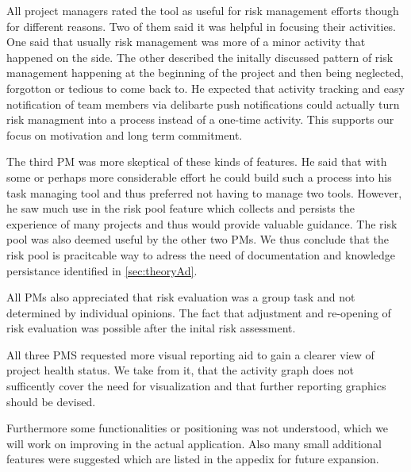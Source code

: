 All project managers rated the tool as useful for risk management efforts though for different reasons. Two of them said it was helpful in focusing their activities. One said that usually risk management was more of a minor activity that happened on the side. The other described the initally discussed pattern of risk management happening at the beginning of the project and then being neglected, forgotton or tedious to come back to. He expected that activity tracking and easy notification of team members via delibarte push notifications could actually turn risk managment into a process instead of a one-time activity. This supports our focus on motivation and long term commitment.

The third PM was more skeptical of these kinds of features. He said that with some or perhaps more considerable effort he could build such a process into his task managing tool and thus preferred not having to manage two tools. However, he saw much use in the risk pool feature which collects and persists the experience of many projects and thus would provide valuable guidance. The risk pool was also deemed useful by the other two PMs. We thus conclude that the risk pool is pracitcable way to adress the need of documentation and knowledge persistance identified in \ref{sec:theoryAd}.

All PMs also appreciated that risk evaluation was a group task and not determined by individual opinions. The fact that adjustment and re-opening of risk evaluation was possible after the inital risk assessment.

All three PMS requested more visual reporting aid to gain a clearer view of project health status. We take from it, that the activity graph does not sufficently cover the need for visualization and that further reporting graphics should be devised.

Furthermore some functionalities or positioning was not understood, which we will work on improving in the actual application. Also many small additional features were suggested which are listed in the appedix for future expansion.
